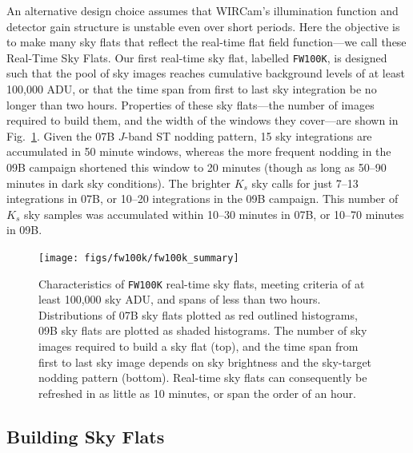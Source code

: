 \documentclass[iop]{emulateapj}
\newcommand{\Fig}[1]{Fig.~\ref{fig:#1}}  %
\begin{document}
An alternative design choice assumes that WIRCam's illumination function and detector gain structure is unstable even over short periods.
Here the objective is to make many sky flats that reflect the real-time flat field function---we call these Real-Time Sky Flats.
Our first real-time sky flat, labelled \texttt{FW100K}, is designed such that the pool of sky images reaches cumulative background levels of at least 100,000 ADU, or that the time span from first to last sky integration be no longer than two hours.
Properties of these sky flats---the number of images required to build them, and the width of the windows they cover---are shown in \Fig{fw100k_summary}.
Given the 07B $J$-band ST nodding pattern, 15 sky integrations are accumulated in 50 minute windows, whereas the more frequent nodding in the 09B campaign shortened this window to 20 minutes (though as long as 50--90 minutes in dark sky conditions).
The brighter $K_s$ sky calls for just 7--13 integrations in 07B, or 10--20 integrations in the 09B campaign.
This number of $K_s$ sky samples was accumulated within 10--30 minutes in 07B, or 10--70 minutes in 09B.

\begin{figure}[t]
\centering
\texttt{[image: figs/fw100k/fw100k\_summary]}
\caption{Characteristics of \texttt{FW100K} real-time sky flats, meeting criteria of at least 100,000 sky ADU, and spans of less than two hours.
Distributions of 07B sky flats plotted as red outlined histograms, 09B sky flats are plotted as shaded histograms.
The number of sky images required to build a sky flat (top), and the time span from first to last sky image depends on sky brightness and the sky-target nodding pattern (bottom).
Real-time sky flats can consequently be refreshed in as little as 10 minutes, or span the order of an hour.}
\label{fig:fw100k_summary}
\end{figure}

\subsection{Building Sky Flats}
\label{sec:flatbuilding}
\end{document}
